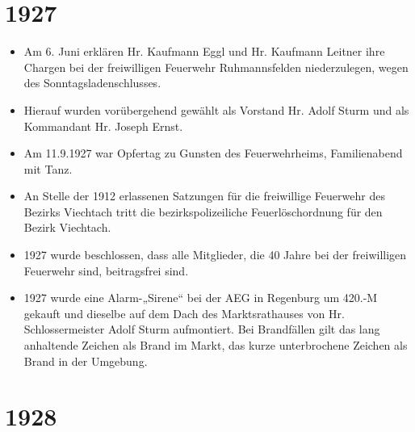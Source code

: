 \documentclass[12pt,a4paper]{book}
\begin{document}
\section*{1927}

\begin{itemize}
\item Am 6. Juni erklären Hr. Kaufmann Eggl und Hr. Kaufmann Leitner
ihre Chargen bei der freiwilligen Feuerwehr Ruhmannsfelden
niederzulegen, wegen des Sonntagsladenschlusses.

\item Hierauf wurden vorübergehend gewählt als Vorstand Hr. Adolf Sturm
und als Kommandant Hr. Joseph Ernst.

\item Am 11.9.1927 war Opfertag zu Gunsten des Feuerwehrheims,
Familienabend mit Tanz.

\item An Stelle der 1912 erlassenen Satzungen für die freiwillige
Feuerwehr des Bezirks Viechtach tritt die bezirkspolizeiliche
Feuerlöschordnung für den Bezirk Viechtach.

\item 1927 wurde beschlossen, dass alle Mitglieder, die 40 Jahre bei der
freiwilligen Feuerwehr sind, beitragsfrei sind.

\item 1927 wurde eine Alarm-„Sirene“ bei der AEG in Regenburg um 420.-M
gekauft und dieselbe auf dem Dach des Marktsrathauses von Hr.
Schlossermeister Adolf Sturm aufmontiert. Bei Brandfällen gilt das lang
anhaltende Zeichen als Brand im Markt, das kurze unterbrochene Zeichen
als Brand in der Umgebung.
\end{itemize}

\section*{1928}
\end{document}
